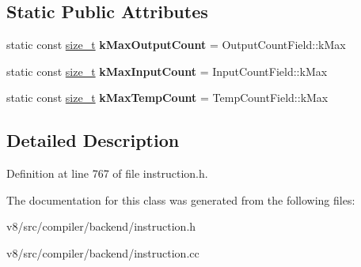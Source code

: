 \subsection*{Static Public Attributes}
\begin{DoxyCompactItemize}
\item 
\mbox{\label{classv8_1_1internal_1_1compiler_1_1Instruction_a930a334f132f75a1ec49fa3800f4f1a8}} 
static const \mbox{\hyperlink{classsize__t}{size\+\_\+t}} {\bfseries k\+Max\+Output\+Count} = Output\+Count\+Field\+::k\+Max
\item 
\mbox{\label{classv8_1_1internal_1_1compiler_1_1Instruction_af7eaf97100daf27ac13aa3d865e59e88}} 
static const \mbox{\hyperlink{classsize__t}{size\+\_\+t}} {\bfseries k\+Max\+Input\+Count} = Input\+Count\+Field\+::k\+Max
\item 
\mbox{\label{classv8_1_1internal_1_1compiler_1_1Instruction_a6633fd2ba6cba2934880852c9275ca95}} 
static const \mbox{\hyperlink{classsize__t}{size\+\_\+t}} {\bfseries k\+Max\+Temp\+Count} = Temp\+Count\+Field\+::k\+Max
\end{DoxyCompactItemize}


\subsection{Detailed Description}


Definition at line 767 of file instruction.\+h.



The documentation for this class was generated from the following files\+:\begin{DoxyCompactItemize}
\item 
v8/src/compiler/backend/instruction.\+h\item 
v8/src/compiler/backend/instruction.\+cc\end{DoxyCompactItemize}

